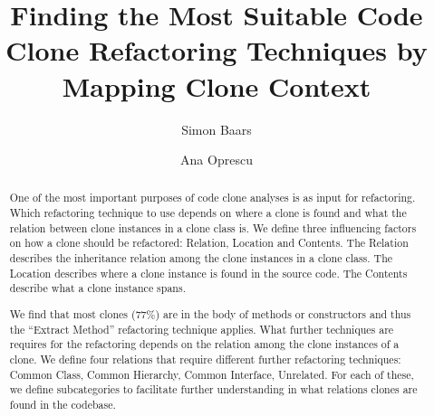 \documentclass[runningheads]{llncs}
\begin{document}
%
\title{Finding the Most Suitable Code Clone Refactoring Techniques by Mapping Clone Context}
%
%
\author{Simon Baars \and
Ana Oprescu}
%
%
%
\maketitle              %
%
\begin{abstract}
One of the most important purposes of code clone analyses is as input for refactoring. Which refactoring technique to use depends on where a clone is found and what the relation between clone instances in a clone class is. We define three influencing factors on how a clone should be refactored: Relation, Location and Contents. The Relation describes the inheritance relation among the clone instances in a clone class. The Location describes where a clone instance is found in the source code. The Contents describe what a clone instance spans.

We find that most clones (77\%) are in the body of methods or constructors and thus the ``Extract Method'' refactoring technique applies. What further techniques are requires for the refactoring depends on the relation among the clone instances of a clone. We define four relations that require different further refactoring techniques: Common Class, Common Hierarchy, Common Interface, Unrelated. For each of these, we define subcategories to facilitate further understanding in what relations clones are found in the codebase.


\end{abstract}
%
%
%
\end{document}

